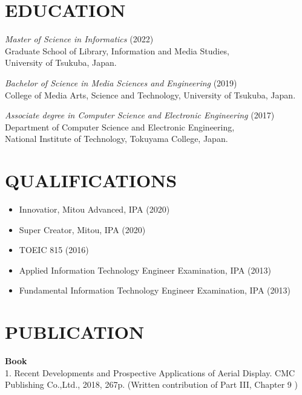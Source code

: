 \documentclass[margin]{res}
\begin{document}
\begin{resume}


\section{EDUCATION}

{\sl Master of Science in Informatics} (2022) \\
Graduate School of Library, Information and Media Studies, \\
University of Tsukuba, Japan.

{\sl Bachelor of Science in Media Sciences and Engineering} (2019) \\
College of Media Arts, Science and Technology,
University of Tsukuba, Japan.

{\sl Associate degree in Computer Science and Electronic Engineering} (2017) \\
Department of Computer Science and Electronic Engineering, \\
National Institute of Technology, Tokuyama College, Japan.

\section{QUALIFICATIONS}

\begin{itemize}
  \item Innovatior, Mitou Advanced, IPA (2020)
  \item Super Creator, Mitou, IPA (2020)
  \item TOEIC 815 (2016)
  \item Applied Information Technology Engineer Examination, IPA (2013)
  \item Fundamental Information Technology Engineer Examination, IPA (2013)
\end{itemize}

\section{PUBLICATION}

{\bf Book} \\
1. Recent Developments and Prospective Applications of Aerial Display. CMC Publishing Co.,Ltd., 2018, 267p. (Written contribution of Part III, Chapter 9 )


\end{resume}
\end{document}
